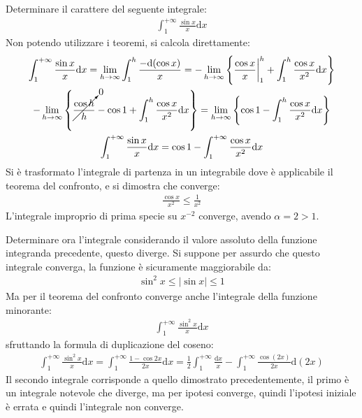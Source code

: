 \documentclass{article}
\newcommand{\df}{\mathrm{d}}
\newcommand{\intab}[4]{\displaystyle\int_{#1}^{#2}{#3}\df{#4}}
\numberwithin{equation}{subsection}
\begin{document}
Determinare il carattere del seguente integrale:
\begin{gather*}
    \displaystyle\int_{1}^{+\infty}\frac{\sin x}x\df x
\end{gather*}
Non potendo utilizzare i teoremi, si calcola direttamente:
\begin{gather*}
    \displaystyle\int_{1}^{+\infty}\frac{\sin x}x\df x=
    \lim_{h\to\infty}\int_{1}^{h}\frac{-\df(\cos x)}x=
    -\lim_{h\to\infty}\left\{\frac{\cos x}{x}\bigg|_1^h+\intab{1}{h}{\frac{\cos x}{x^2}}{x}\right\}\\
    -\lim_{h\to\infty}\left\{\cancelto{0}{\frac{\cos h}{h}}-\cos1+\intab{1}{h}{\frac{\cos x}{x^2}}{x}\right\}=
    \lim_{h\to\infty}\left\{\cos1-\intab{1}{h}{\frac{\cos x}{x^2}}{x}\right\}\\
    \displaystyle\int_{1}^{+\infty}\frac{\sin x}x\df x=\cos1-\int_1^{+\infty}\frac{\cos x}{x^2}\df x
\end{gather*}
Si è trasformato l'integrale di partenza in un integrabile dove è applicabile il teorema del confronto, e si dimostra che converge:
\begin{gather*}
    \frac{\cos x}{x^2}\leq\frac{1}{x^2}
\end{gather*}
L'integrale improprio di prima specie su $x^{-2}$ converge, avendo $\alpha=2>1$. 

Determinare ora l'integrale considerando il valore assoluto della funzione integranda precedente, questo diverge. Si suppone per assurdo che questo integrale converga, la funzione è sicuramente maggiorabile da:
\begin{gather*}
    \sin^2x\leq|\sin x|\leq1
\end{gather*}
Ma per il teorema del confronto converge anche l'integrale della funzione minorante:
\begin{gather*}
    \displaystyle\int_{1}^{+\infty}\frac{\sin^2 x}x\df x
\end{gather*}
sfruttando la formula di duplicazione del coseno:
\begin{gather*}
    \displaystyle\int_{1}^{+\infty}\frac{\sin^2 x}x\df x=
    \int_1^{+\infty}\frac{1-\cos2x}{2x}\df x=
    \frac{1}{2}\int_1^{+\infty}\frac{\df x}{x}-\int_1^{+\infty}\frac{\cos(2x)}{2x}\df (2x)
\end{gather*}
Il secondo integrale corrisponde a quello dimostrato precedentemente, il primo è un integrale notevole che diverge, ma per ipotesi converge, quindi l'ipotesi iniziale è errata e quindi l'integrale non converge. 

\end{document}
